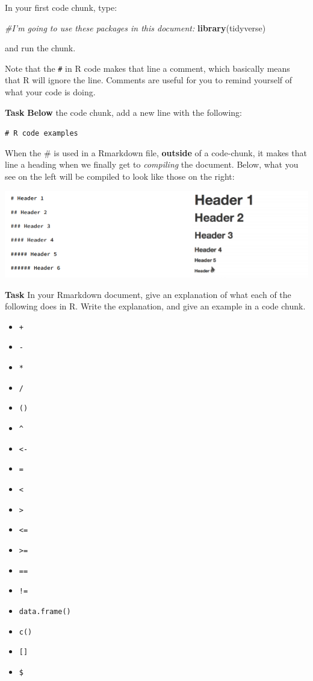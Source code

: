 \documentclass[12pt,]{krantz}
\newenvironment{Shaded}{\begin{snugshade}}{\end{snugshade}}
\newcommand{\CommentTok}[1]{\textcolor[rgb]{0.56,0.35,0.01}{\textit{#1}}}
\newcommand{\KeywordTok}[1]{\textcolor[rgb]{0.13,0.29,0.53}{\textbf{#1}}}
\newcommand{\NormalTok}[1]{#1}
\providecommand{\tightlist}{%
  \setlength{\itemsep}{0pt}\setlength{\parskip}{0pt}}
\begin{document}
In your first code chunk, type:

\begin{Shaded}
\begin{Highlighting}[]
\CommentTok{#I'm going to use these packages in this document:}
\KeywordTok{library}\NormalTok{(tidyverse)}
\end{Highlighting}
\end{Shaded}

and run the chunk.

Note that the \texttt{\#} in R code makes that line a comment, which basically means that R will ignore the line. Comments are useful for you to remind yourself of what your code is doing.

\textbf{Task}
\textbf{Below} the code chunk, add a new line with the following:

\texttt{\#\ R\ code\ examples}

When the \# is used in a Rmarkdown file, \textbf{outside} of a code-chunk, it makes that line a heading when we finally get to \emph{compiling} the document. Below, what you see on the left will be compiled to look like those on the right:

\begin{center}\includegraphics[width=0.4\linewidth]{images/headings} \end{center}

\textbf{Task}
In your Rmarkdown document, give an explanation of what each of the following does in R.
Write the explanation, and give an example in a code chunk.

\begin{itemize}
\tightlist
\item
  \texttt{+}
\item
  \texttt{-}
\item
  \texttt{*}
\item
  \texttt{/}
\item
  \texttt{()}
\item
  \texttt{\^{}}
\item
  \texttt{\textless{}-}
\item
  \texttt{=}
\item
  \texttt{\textless{}}
\item
  \texttt{\textgreater{}}
\item
  \texttt{\textless{}=}
\item
  \texttt{\textgreater{}=}
\item
  \texttt{==}
\item
  \texttt{!=}
\item
  \texttt{data.frame()}
\item
  \texttt{c()}
\item
  \texttt{{[}{]}}
\item
  \texttt{\$}
\end{itemize}
\end{document}

